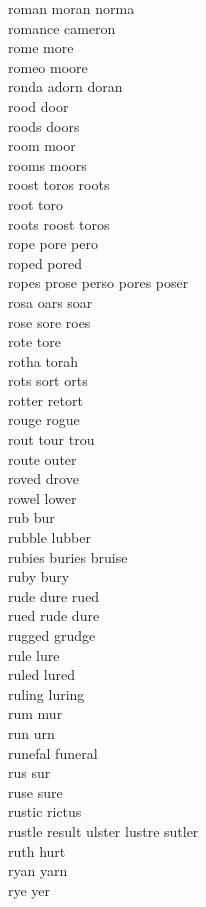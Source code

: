 roman moran norma\\
romance cameron\\
rome more\\
romeo moore\\
ronda adorn doran\\
rood door\\
roods doors\\
room moor\\
rooms moors\\
roost toros roots\\
root toro\\
roots roost toros\\
rope pore pero\\
roped pored\\
ropes prose perso pores poser\\
rosa oars soar\\
rose sore roes\\
rote tore\\
rotha torah\\
rots sort orts\\
rotter retort\\
rouge rogue\\
rout tour trou\\
route outer\\
roved drove\\
rowel lower\\
rub bur\\
rubble lubber\\
rubies buries bruise\\
ruby bury\\
rude dure rued\\
rued rude dure\\
rugged grudge\\
rule lure\\
ruled lured\\
ruling luring\\
rum mur\\
run urn\\
runefal funeral\\
rus sur\\
ruse sure\\
rustic rictus\\
rustle result ulster lustre sutler\\
ruth hurt\\
ryan yarn\\
rye yer\\

